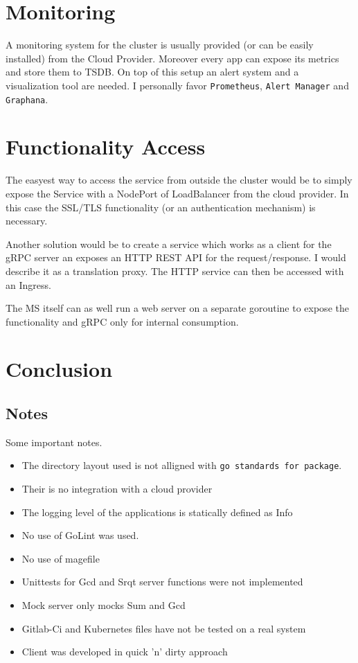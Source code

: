 \documentclass[a4paper,10pt]{article}
\begin{document}
\section{Monitoring}
A monitoring system for the cluster is usually provided (or can be easily installed) from the Cloud Provider. Moreover every app can expose its metrics and store them to TSDB. On top of this setup an alert system and a visualization tool are needed. I personally favor 
\texttt{Prometheus}, \texttt{Alert Manager} and \texttt{Graphana}.

\section{Functionality Access}
The easyest way to access the service from outside the cluster would be to simply expose 
the Service with a NodePort of LoadBalancer from the cloud provider. In this case the 
SSL/TLS functionality (or an authentication mechanism) is necessary.

Another solution would be to create a service which works as a client for the gRPC server 
an exposes an HTTP REST API for the request/response. I would describe it as a translation 
proxy. The HTTP service can then be accessed with an Ingress.

The MS itself can as well run a web server on a separate goroutine to expose the functionality and gRPC only for internal consumption.


\section{Conclusion}
\subsection{Notes}
Some important notes.
\begin{itemize}
 \item The directory layout used is not alligned with \texttt{go standards for package}.
 \item Their is no integration with a cloud provider
 \item The logging level of the applications is statically defined as Info
 \item No use of GoLint was used.
 \item No use of magefile
 \item Unittests for Gcd and Srqt server functions were not implemented
 \item Mock server only mocks Sum and Gcd
 \item Gitlab-Ci and Kubernetes files have not be tested on a real system
 \item Client was developed in quick 'n' dirty approach
\end{itemize}
\end{document}
